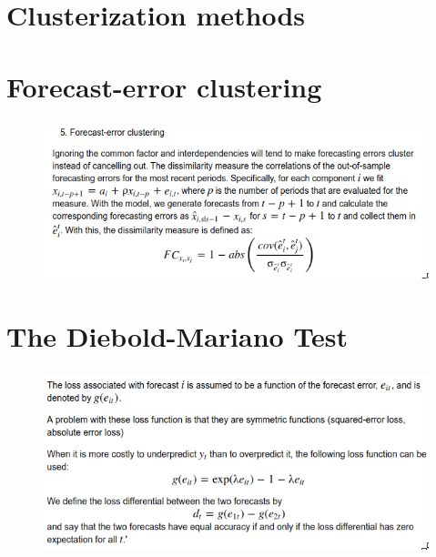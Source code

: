 \documentclass[c, dvipsnames]{beamer}  %
\begin{document}
\section{Clusterization methods}

\section{Forecast-error clustering}


\begin{frame}[shrink=5]
\frametitle{\insertsection} 
\framesubtitle{\insertsubsection}


\begin{figure}
	\centering
	\includegraphics[width=0.7\linewidth]{screenshot043}
	\label{fig:screenshot029}
\end{figure}


\end{frame}



\section{The Diebold-Mariano Test}


\begin{frame}[shrink=5]
\frametitle{\insertsection} 


\begin{figure}
	\centering
	\includegraphics[width=0.7\linewidth]{screenshot044}
	\label{fig:screenshot029}
\end{figure}






\end{frame}
\end{document}

